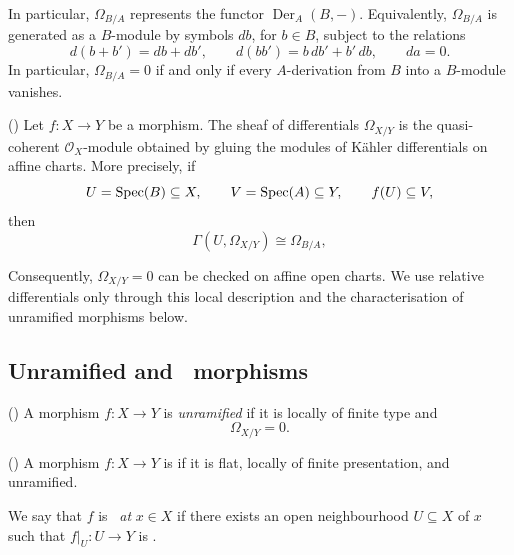 \begin{remark}
	In particular, $\Omega_{B/A}$ represents the functor $\operatorname{Der}_A(B,-)$. 
	Equivalently, $\Omega_{B/A}$ is generated as a
	$B$-module by symbols $db$, for $b\in B$, subject
	to the relations
	\[
	d(b+b')=db+db',
	\qquad
	d(bb')=b\,db'+b'\,db,
	\qquad
	da=0.
	\]
	In particular, $\Omega_{B/A}=0$ if and only if every
	$A$-derivation from $B$ into a $B$-module vanishes.
	
\end{remark}


\begin{definition}
	(\cite[][Tag 01UU]{stacks-project})
	Let $f:X\to Y$ be a morphism. The
	sheaf of  differentials
	$\Omega_{X/Y}$ is the quasi-coherent
	$\mathcal{O}_X$-module obtained by gluing the modules
	of K\"ahler differentials on affine charts.
	More precisely, if
	\[
	U=\operatorname{Spec}\!\left(B\right)\subseteq X,
	\qquad
	V=\operatorname{Spec}\!\left(A\right)\subseteq Y,
	\qquad
	f(U)\subseteq V,
	\]
	then
	\[
	\Gamma(U, \Omega_{X/Y}) \cong \Omega_{B/A},
	\]
\end{definition}

\begin{remark}
	Consequently, $\Omega_{X/Y}=0$ can be checked on
	affine open charts. We use relative differentials
	only through this local description and the
	characterisation of unramified morphisms below.
\end{remark}


\subsection{Unramified and \etale\ morphisms}

\begin{definition}
	\label{def:unramified-morphism}
	(\cite[][Section 02G3]{stacks-project})
	A morphism $f:X\to Y$ is \emph{unramified} if it
	is locally of finite type and
	\[
	\Omega_{X/Y}=0.
	\]
\end{definition}

\begin{definition}
	\label{def:etale-morphism}
	(\cite[][Section 02GH]{stacks-project})
	A morphism $f:X\to Y$ is \emph{\etale} if it is
	flat, locally of finite presentation, and unramified.
	
	We say that $f$ is \etale\ \emph{at} $x\in X$
	if there exists an open neighbourhood $U\subseteq X$
	of $x$ such that $f|_U:U\to Y$ is \etale.
\end{definition}

